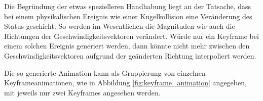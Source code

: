 Die Begründung der etwas spezielleren Handhabung liegt an der Tatsache, dass bei einem physikalischen Ereignis wie
einer Kugelkollision eine Veränderung des Status geschieht. So werden im Wesentlichen die Magnituden wie auch die
Richtungen der Geschwindigkeitsvektoren verändert. Würde nur ein Keyframe bei einem solchen Ereignis generiert werden,
dann könnte nicht mehr zwischen den Geschwindigkeitsvektoren aufgrund der geänderten Richtung interpoliert werden.

Die so generierte Animation kann als Gruppierung von einzelnen Keyframeanimationen, wie in Abbildung \ref{fig:keyframe_animation}
angegeben, mit jeweils nur zwei Keyframes angesehen werden.